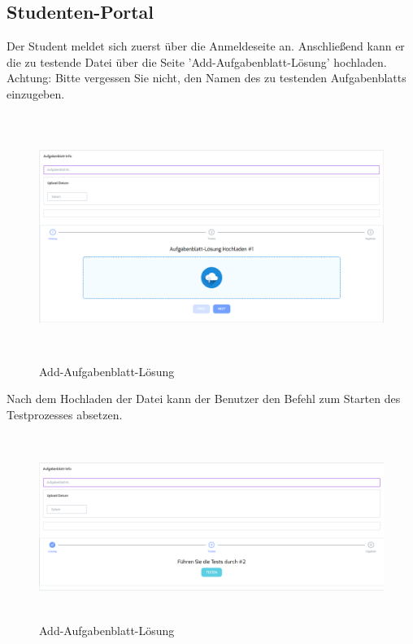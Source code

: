 \documentclass[a4paper,12pt,oneside]{book}
\begin{document}
\subsection{Studenten-Portal}
Der Student meldet sich zuerst über die Anmeldeseite an. Anschließend kann er die zu testende Datei über die Seite 'Add-Aufgabenblatt-Lösung' hochladen.
\newline
Achtung: Bitte vergessen Sie nicht, den Namen des zu testenden Aufgabenblatts einzugeben.
\begin{figure}[h!]
	\begin{center}
		\includegraphics[width=16cm, height=8cm]{Add-Aufgabenblatt-Loesung.PNG}
		\caption{Add-Aufgabenblatt-Lösung} 
		\label{Add-Aufgabenblatt-Lösung} 
	\end{center}
\end{figure}
\newline
Nach dem Hochladen der Datei kann der Benutzer den Befehl zum Starten des Testprozesses absetzen.
\begin{figure}[h!]
	\begin{center}
		\includegraphics[width=16cm, height=6cm]{tests-fuehren.PNG}
		\caption{Add-Aufgabenblatt-Lösung} 
		\label{Add-Aufgabenblatt-Lösung} 
	\end{center}
\end{figure}
\end{document}
